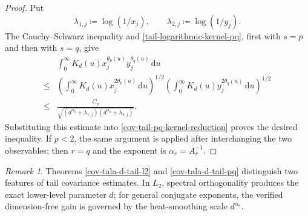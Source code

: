 \documentclass{amsbook}
\theoremstyle{definition}
\theoremstyle{remark}
\newtheorem{remark}[theorem]{Remark}
\numberwithin{section}{chapter}
\numberwithin{equation}{chapter}
\newcommand{\1}{\mathbf{1}}
\begin{document}
\begin{proof}
Put
\[
\lambda_{1,j}\coloneqq \log(1/x_{j}),\qquad \lambda_{2,j}\coloneqq\log(1/y_{j}).
\]
The Cauchy--Schwarz inequality and \eqref{tail-logarithmic-kernel-pq}, first
with $s=p$ and then with $s=q$, give
\begin{align*}
&\int_{0}^{\infty}K_{d}(u)
 x_{j}^{\theta_{p}(u)}y_{j}^{\theta_{q}(u)}\,\mathrm{d}u\\
\leq &\left(\int_{0}^{\infty}K_{d}(u)x_{j}^{2\theta_{p}(u)}\,\mathrm{d}u\right)^{1/2}
\left(\int_{0}^{\infty}K_{d}(u)y_{j}^{2\theta_{q}(u)}\,\mathrm{d}u\right)^{1/2}\\
\leq&\frac{C_{p}}
{\sqrt{\left(d^{\alpha_{p}}+\lambda_{1,j}\right)
       \left(d^{\alpha_{p}}+\lambda_{2,j}\right)}}.
\end{align*}
Substituting this estimate into \eqref{cov-tail-pq-kernel-reduction} proves
the desired inequality.  If $p<2$, the same argument is applied after
interchanging the two observables; then $r=q$ and the exponent is
$\alpha_{r}=A_{r}^{-1}$.
\end{proof}

\begin{remark}
Theorems \ref{cov-tala-d-tail-l2} and \ref{cov-tala-d-tail-pq} distinguish two
features of tail covariance estimates.  In $L_{2}$, spectral orthogonality
produces the exact lower-level parameter $d$; for general conjugate exponents,
the verified dimension-free gain is governed by the heat-smoothing scale
$d^{\alpha_{r}}$.
\end{remark}
\end{document}
